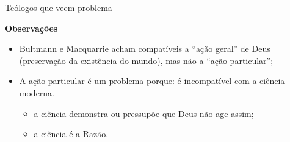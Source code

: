 \begin{frame}{Teólogos que veem problema}
\centering
\begin{minipage}{\textwidth}
	\begin{exampleblock}{\textbf{Observações}}
	 \begin{itemize}
			\item<2->[$\bullet$] Bultmann e Macquarrie acham compatíveis a ``ação geral'' de Deus 
			 (preservação da existência do mundo), mas não a ``ação particular'';
			\item<3->[$\bullet$] A ação particular é um problema porque: é incompatível com a ciência
			 moderna.
				\begin{itemize}
					\item<4-> a ciência \textcolor{NordYellow}{demonstra} ou 
					 \textcolor{NordYellow}{pressupõe} que Deus não age assim;
					\item<5-> a ciência é a Razão.
				\end{itemize}
		\end{itemize}
	\end{exampleblock}
	\end{minipage}
\end{frame}


